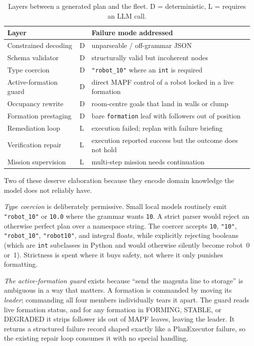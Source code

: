 \documentclass[10pt,twocolumn]{article}
\newcommand{\code}[1]{\texttt{\small #1}}
\begin{document}
\begin{table}[t]
\centering\small
\caption{Layers between a generated plan and the fleet. D = deterministic,
L = requires an LLM call.}
\label{tab:guards}
\begin{tabular}{@{}llp{3.5cm}@{}}
\toprule
\textbf{Layer} & & \textbf{Failure mode addressed} \\
\midrule
Constrained decoding      & D & unparseable / off-grammar JSON \\
Schema validator          & D & structurally valid but incoherent nodes \\
Type coercion             & D & \code{"robot\_10"} where an \code{int} is required \\
Active-formation guard    & D & direct MAPF control of a robot locked in a live formation \\
Occupancy rewrite         & D & room-centre goals that land in walls or clump \\
Formation prestaging      & D & bare \code{formation} leaf with followers out of position \\
\midrule
Remediation loop          & L & execution failed; replan with failure briefing \\
Verification repair       & L & execution reported success but the outcome does not hold \\
Mission supervision       & L & multi-step mission needs continuation \\
\bottomrule
\end{tabular}
\end{table}

Two of these deserve elaboration because they encode domain knowledge the model
does not reliably have.

\emph{Type coercion} is deliberately permissive. Small local models routinely
emit \code{"robot\_10"} or \code{10.0} where the grammar wants \code{10}. A
strict parser would reject an otherwise perfect plan over a namespace string.
The coercer accepts \code{10}, \code{"10"}, \code{"robot\_10"},
\code{"robot10"}, and integral floats, while explicitly rejecting booleans
(which are \code{int} subclasses in Python and would otherwise silently become
robot~0 or~1). Strictness is spent where it buys safety, not where it only
punishes formatting.

\emph{The active-formation guard} exists because ``send the magenta line to
storage'' is ambiguous in a way that matters. A formation is commanded by moving
its \emph{leader}; commanding all four members individually tears it apart. The
guard reads live formation status, and for any formation in FORMING, STABLE, or
DEGRADED it strips follower ids out of MAPF leaves, leaving the leader. It
returns a structured failure record shaped exactly like a PlanExecutor failure,
so the existing repair loop consumes it with no special handling.
\end{document}
